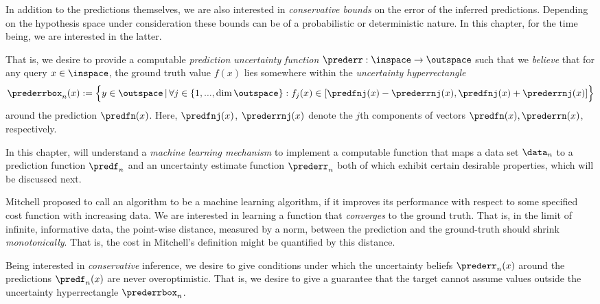 In addition to the predictions themselves, we are also interested in \textit{conservative bounds} on the error of the inferred predictions. Depending on the hypothesis space under consideration these bounds can be of a probabilistic or deterministic nature. In this chapter, for the time being, we are interested in the latter.

That is, we desire to provide a computable \textit{prediction uncertainty function} $\prederr: \inspace \to \outspace$ such that we \textit{believe} that for any query $x \in \inspace$, the ground truth value $f(x)$ lies somewhere within the \textit{uncertainty hyperrectangle }
\begin{equation}
	\prederrbox_n(x) := \Bigl\{ y \in \outspace \, | \, \forall j \in \{1,...,\dim{\outspace}\} : f_j(x) \in [ \predfnj(x) - \prederrnj(x), \predfnj(x) + \prederrnj(x)] \Bigr\}
\end{equation} around the prediction $\predfn (x)$.
Here, $\predfnj(x)$, $\prederrnj(x)$ denote the $j$th components of vectors $\predfn(x), \prederrn(x)$, respectively.


In this chapter, will understand a \textit{machine learning mechanism} to implement a computable function that maps a data set $\data_n $ to a prediction function $\predf_n$ and an uncertainty estimate function $\prederr_n$ both of which exhibit certain desirable properties, which will be discussed next. 

Mitchell \cite{mitchellbook:97} proposed to call an algorithm to be a machine learning algorithm, if it improves its performance with respect to some specified cost function with increasing data. We are interested in learning a function that \textit{converges} to the ground truth. That is, in the limit of infinite, informative data, the point-wise distance, measured by a norm, between the prediction and the ground-truth should shrink \textit{monotonically}. That is, the cost in Mitchell's definition might be quantified by this distance.


Being interested in \textit{conservative} inference, we desire to give conditions under which the uncertainty beliefs $\prederr_n(x)$ around the predictions $\predf_n(x)$ are never overoptimistic. That is, we desire to give a guarantee that the target cannot assume values outside the uncertainty hyperrectangle $\prederrbox_n$.

